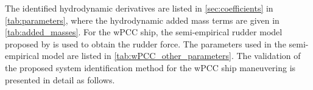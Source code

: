 \noindent The identified hydrodynamic derivatives are listed in \autoref{sec:coefficients} in \autoref{tab:parameters}, where the hydrodynamic added mass terms are given in \autoref{tab:added_masses}. For the wPCC ship, the semi-empirical rudder model proposed by \cite{alexanderssonSystemIdentificationPhysicsinformed2024b} is used to obtain the rudder force. The parameters used in the semi-empirical model are listed in \autoref{tab:wPCC_other_parameters}. The validation of the proposed system identification method for the wPCC ship maneuvering is presented in detail as follows.